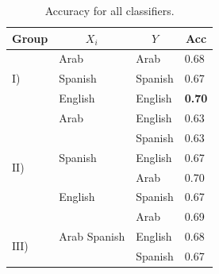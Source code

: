 \documentclass[runningheads]{llncs}
\begin{document}

\begin{table}[]
\centering
\caption{Accuracy for all classifiers.}
\label{results_accuracy}
\begin{tabular}{@{}llll@{}}
\toprule
\multicolumn{1}{c}{Group}        & \multicolumn{1}{c}{$X_i$} & \multicolumn{1}{c}{$Y$} & \multicolumn{1}{c}{Acc} \\ \midrule
\multirow{3}{*}{$\mathrm{I}$)}    & Arab                      & Arab                    & 0.68                         \\
                                 & Spanish                   & Spanish                 & 0.67                         \\
                                 & English                   & English                 & \textbf{0.70}                \\ \midrule
\multirow{6}{*}{$\mathrm{II}$)}   & Arab                      & English                 & 0.63                         \\
                                 &                           & Spanish                 & 0.63                         \\
                                 & Spanish                   & English                 & 0.67                         \\
                                 &                           & Arab                    & 0.70                         \\
                                 & English                   & Spanish                 & 0.67                         \\
                                 &                           & Arab                    & 0.69                         \\ \midrule
\multirow{12}{*}{$\mathrm{III}$)} & Arab Spanish              & English                 & 0.68                         \\
                                 &                           & Spanish                 & 0.67                         \\

\end{tabular}
\end{table}
\end{document}
